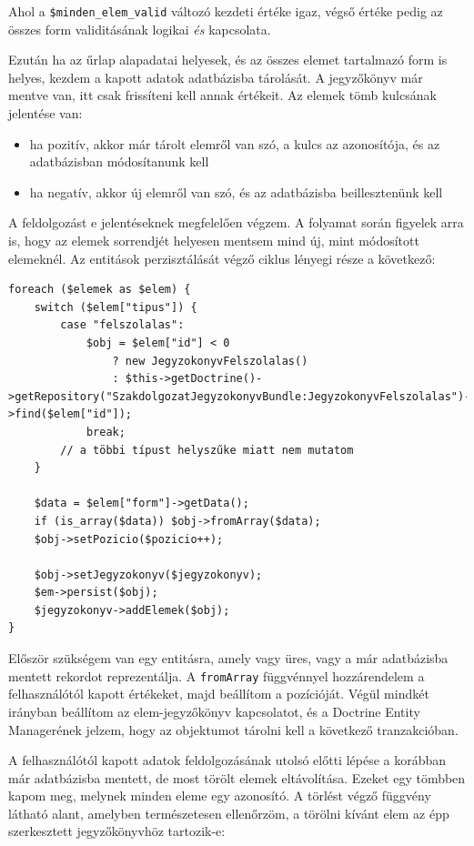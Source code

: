 \documentclass[a4paper,12pt,oneside]{report}
\begin{document}
Ahol a {\tt \$minden\_elem\_valid} változó kezdeti értéke igaz, végső értéke pedig az összes form validitásának logikai {\it és} kapcsolata.

Ezután ha az űrlap alapadatai helyesek, és az összes elemet tartalmazó form is helyes, kezdem a kapott adatok adatbázisba tárolását. A jegyzőkönyv már mentve van, itt csak frissíteni kell annak értékeit. Az elemek tömb kulcsának jelentése van:

\begin{itemize}
    \item ha pozitív, akkor már tárolt elemről van szó, a kulcs az azonosítója, és az adatbázisban módosítanunk kell
    \item ha negatív, akkor új elemről van szó, és az adatbázisba beillesztenünk kell
\end{itemize}

A feldolgozást e jelentéseknek megfelelően végzem. A folyamat során figyelek arra is, hogy az elemek sorrendjét helyesen mentsem mind új, mint módosított elemeknél. Az entitások perzisztálását végző ciklus lényegi része a következő:

\begin{lstlisting}
foreach ($elemek as $elem) {
    switch ($elem["tipus"]) {
        case "felszolalas":
            $obj = $elem["id"] < 0
                ? new JegyzokonyvFelszolalas()
                : $this->getDoctrine()->getRepository("SzakdolgozatJegyzokonyvBundle:JegyzokonyvFelszolalas")->find($elem["id"]);
            break;
        // a többi típust helyszűke miatt nem mutatom
    }

    $data = $elem["form"]->getData();
    if (is_array($data)) $obj->fromArray($data);
    $obj->setPozicio($pozicio++);

    $obj->setJegyzokonyv($jegyzokonyv);
    $em->persist($obj);
    $jegyzokonyv->addElemek($obj);
}
\end{lstlisting}

Először szükségem van egy entitásra, amely vagy üres, vagy a már adatbázisba mentett rekordot reprezentálja. A {\tt fromArray} függvénnyel hozzárendelem a felhasználótól kapott értékeket, majd beállítom a pozícióját. Végül mindkét irányban beállítom az elem-jegyzőkönyv kapcsolatot, és a Doctrine Entity Managerének jelzem, hogy az objektumot tárolni kell a következő tranzakcióban.

A felhasználótól kapott adatok feldolgozásának utolsó előtti lépése a korábban már adatbázisba mentett, de most törölt elemek eltávolítása. Ezeket egy tömbben kapom meg, melynek minden eleme egy azonosító. A törlést végző függvény látható alant, amelyben természetesen ellenőrzöm, a törölni kívánt elem az épp szerkesztett jegyzőkönyvhöz tartozik-e:
\end{document}

